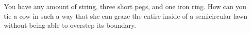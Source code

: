 You have any amount of string, three short pegs, and one iron ring. How can you tie a cow in such a way that she can graze the entire inside of a semicircular lawn without being able to overstep its boundary.
